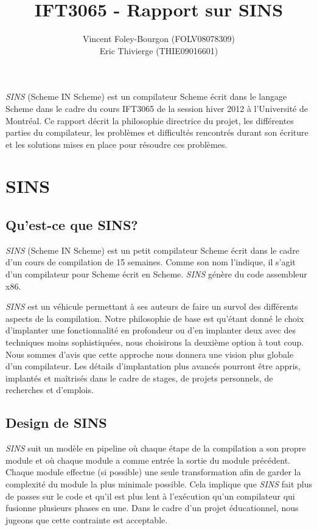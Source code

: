 \documentclass[11pt]{report}
\begin{document}
\newcommand{\sins}{\emph{SINS}}
\newcommand{\bop}{\textbf{(}}
\newcommand{\bcp}{\textbf{)}}

\title{IFT3065 - Rapport sur SINS}
\author{Vincent Foley-Bourgon (FOLV08078309) \\
Eric Thivierge (THIE09016601)}
\maketitle

\abstract

\sins{} (Scheme IN Scheme) est un compilateur Scheme écrit dans le
langage Scheme dans le cadre du cours IFT3065 de la session hiver 2012
à l'Université de Montréal.  Ce rapport décrit la philosophie
directrice du projet, les différentes parties du compilateur, les
problèmes et difficultés rencontrés durant son écriture et les
solutions mises en place pour résoudre ces problèmes.

\chapter{SINS}

\section{Qu'est-ce que SINS?}

\sins{} (Scheme IN Scheme) est un petit compilateur Scheme écrit
dans le cadre d'un cours de compilation de 15 semaines.  Comme son nom
l'indique, il s'agit d'un compilateur pour Scheme écrit en Scheme.
\sins{} génère du code assembleur x86.

\sins{} est un véhicule permettant à ses auteurs de faire un survol
des différents aspects de la compilation. Notre philosophie de base
est qu'étant donné le choix d'implanter une fonctionnalité en
profondeur ou d'en implanter deux avec des techniques moins
sophistiquées, nous choisirons la deuxième option à tout coup. Nous
sommes d'avis que cette approche nous donnera une vision plus globale
d'un compilateur. Les détails d'implantation plus avancés pourront
être appris, implantés et maîtrisés dans le cadre de stages, de
projets personnels, de recherches et d'emplois.


\section{Design de SINS}

\sins{} suit un modèle en pipeline où chaque étape de la compilation a
son propre module et où chaque module a comme entrée la sortie du
module précédent. Chaque module effectue (si possible) une seule
transformation afin de garder la complexité du module la plus minimale
possible. Cela implique que \sins{} fait plus de passes sur le code et
qu'il est plus lent à l'exécution qu'un compilateur qui fusionne
plusieurs phases en une. Dans le cadre d'un projet éducationnel, nous
jugeons que cette contrainte est acceptable.
\end{document}
